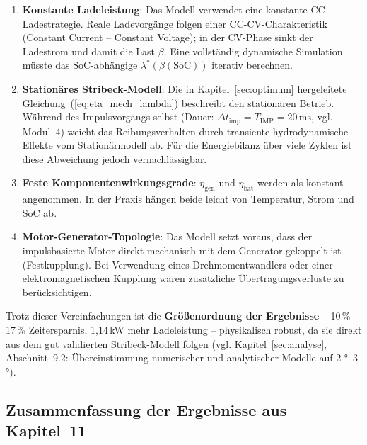 ﻿\documentclass[a4paper,12pt]{article}
\begin{document}
\begin{enumerate}
  \item \textbf{Konstante Ladeleistung}: Das Modell verwendet eine
    konstante CC-Ladestrategie. Reale Ladevorgänge folgen einer
    CC-CV-Charakteristik (Constant Current -- Constant Voltage);
    in der CV-Phase sinkt der Ladestrom und damit die Last $\beta$.
    Eine vollständig dynamische Simulation müsste das SoC-abhängige
    $\lambda^*(\beta(\text{SoC}))$ iterativ berechnen.

  \item \textbf{Stationäres Stribeck-Modell}: Die in Kapitel~\ref{sec:optimum}
    hergeleitete Gleichung~(\ref{eq:eta_mech_lambda}) beschreibt den
    stationären Betrieb. Während des Impulsvorgangs selbst (Dauer:
    $\Delta t_\text{imp} = T_\text{IMP} = 20\,\text{ms}$, vgl. Modul~4)
    weicht das Reibungsverhalten durch transiente hydrodynamische Effekte
    vom Stationärmodell ab. Für die Energiebilanz über viele Zyklen
    ist diese Abweichung jedoch vernachlässigbar.

  \item \textbf{Feste Komponentenwirkungsgrade}: $\eta_\text{gen}$
    und $\eta_\text{bat}$ werden als konstant angenommen. In der Praxis
    hängen beide leicht von Temperatur, Strom und SoC ab.

  \item \textbf{Motor-Generator-Topologie}: Das Modell setzt voraus,
    dass der impulsbasierte Motor direkt mechanisch mit dem Generator
    gekoppelt ist (Festkupplung). Bei Verwendung eines Drehmomentwandlers
    oder einer elektromagnetischen Kupplung wären zusätzliche
    Übertragungsverluste zu berücksichtigen.
\end{enumerate}

Trotz dieser Vereinfachungen ist die \textbf{Größenordnung der Ergebnisse}
-- 10\,\%--17\,\% Zeitersparnis, 1{,}14\,kW mehr Ladeleistung --
physikalisch robust, da sie direkt aus dem gut validierten Stribeck-Modell
folgen (vgl. Kapitel~\ref{sec:analyse}, Abschnitt~9.2: Übereinstimmung
numerischer und analytischer Modelle auf 2 °--3 °).

\subsection{Zusammenfassung der Ergebnisse aus Kapitel~11}
\end{document}
